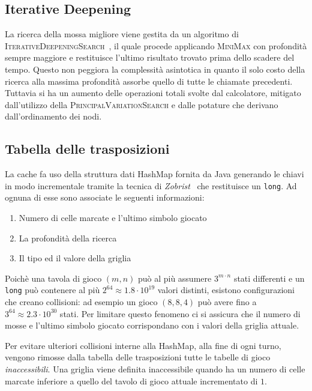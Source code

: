 \documentclass{article}
\begin{document}
\subsection{Iterative Deepening}

La ricerca della mossa migliore viene gestita da un algoritmo di
\textsc{IterativeDeepeningSearch}~\cite{id}, il quale procede applicando \textsc{MiniMax} 
con profondit\`a sempre maggiore e restituisce l'ultimo risultato trovato prima dello
scadere del tempo. \label{cost:id} Questo non peggiora la complessit\`a asintotica in quanto il
solo costo della ricerca alla massima profondit\`a assorbe quello di tutte
le chiamate precedenti. Tuttavia si ha un aumento delle operazioni totali svolte
dal calcolatore, mitigato dall'utilizzo della \textsc{PrincipalVariationSearch} 
e dalle potature che derivano dall'ordinamento dei nodi.

\subsection{Tabella delle trasposizioni}

La cache fa uso della struttura dati HashMap fornita da Java generando le chiavi 
in modo incrementale tramite la tecnica di \emph{Zobrist}~\cite{zobrist} che restituisce un \verb!long!. 
Ad ognuna di esse sono associate le seguenti informazioni:
\begin{enumerate}
  \item Numero di celle marcate e l'ultimo simbolo giocato
  \item La profondit\`a della ricerca
  \item Il tipo ed il valore della griglia
\end{enumerate}
Poich\`e una tavola di gioco $(m,n)$ pu\`o al pi\`u assumere $3^{m \cdot n}$ stati differenti e
un \verb!long! pu\`o contenere al pi\`u $2^{64} \approx 1.8 \cdot 10^{19}$ valori distinti,
esistono configurazioni che creano collisioni: ad esempio un gioco $(8, 8, 4)$
pu\`o avere fino a $3^{64} \approx 2.3 \cdot 10^{30}$ stati. Per limitare questo
fenomeno ci si assicura che il numero di mosse e l'ultimo simbolo giocato
corrispondano con i valori della griglia attuale.

Per evitare ulteriori collisioni interne alla HashMap, alla fine di ogni turno,
vengono rimosse dalla tabella delle trasposizioni tutte le tabelle di gioco
\emph{inaccessibili}. Una griglia viene definita inaccessibile quando ha un numero di
celle marcate inferiore a quello del tavolo di gioco attuale incrementato di $1$.
\end{document}
